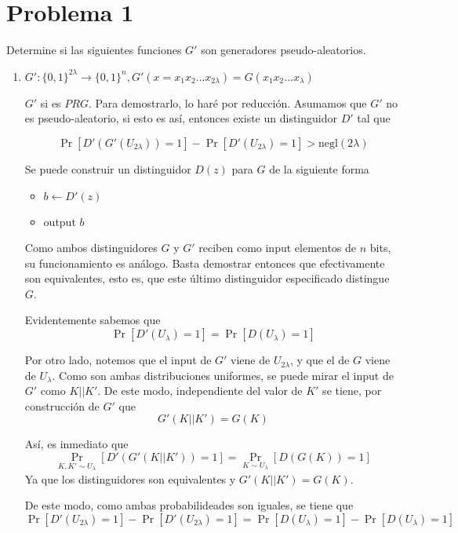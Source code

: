 \documentclass[twoside]{tareas}
\begin{document}
\maketitle

\section*{Problema 1}

Determine si las siguientes funciones $G'$ son generadores pseudo-aleatorios.

\begin{enumerate}
    \item {\boldmath$G': \{0,1\}^{2\lambda} \rightarrow \{0,1\}^{n}, G'(x = x_1 x_2 ...x_{2\lambda}) = G(x_1 x_2 ...x_{\lambda})$}

    $G'$ si es $PRG$. Para demostrarlo, lo haré por reducción. Asumamos que $G'$ no es pseudo-aleatorio, si esto es así, entonces existe un distinguidor $D'$ tal que

    $$\Pr[D'(G'(U_{2\lambda})) = 1] - \Pr[D'(U_{2\lambda}) = 1] > \text{negl}(2\lambda)$$

    Se puede construir un distinguidor $D(z)$ para $G$ de la siguiente forma

    \begin{itemize}
        \item $b \leftarrow D'(z)$
        \item output $b$
    \end{itemize}

    Como ambos distinguidores $G$ y $G'$ reciben como input elementos de $n$ bits, su funcionamiento es análogo. Basta demostrar entonces que efectivamente son equivalentes, esto es, que este último distinguidor especificado distingue $G$.

    Evidentemente sabemos que
    $$\Pr[D'(U_\lambda) = 1] = \Pr[D(U_\lambda) = 1]$$

    Por otro lado, notemos que el input de $G'$ viene de $U_{2\lambda}$, y que el de $G$ viene de $U_\lambda$. Como son ambas distribuciones uniformes, se puede mirar el input de $G'$ como $K||K'$. De este modo, independiente del valor de $K'$ se tiene, por construcción de $G'$ que
    $$G'(K||K') = G(K)$$

    Así, es inmediato que
    $$\Pr_{K,K' \sim U_\lambda}[D'(G'(K||K')) = 1] = \Pr_{K \sim U_\lambda}[D(G(K)) = 1]$$
    Ya que los distinguidores son equivalentes y $G'(K||K') = G(K)$.

    De este modo, como ambas probabilideades son iguales, se tiene que
    $$\Pr[D'(U_{2\lambda}) = 1] - \Pr[D'(U_{2\lambda}) = 1] = \Pr[D(U_\lambda) = 1] - \Pr[D(U_\lambda) = 1]$$


\end{enumerate}
\end{document}

